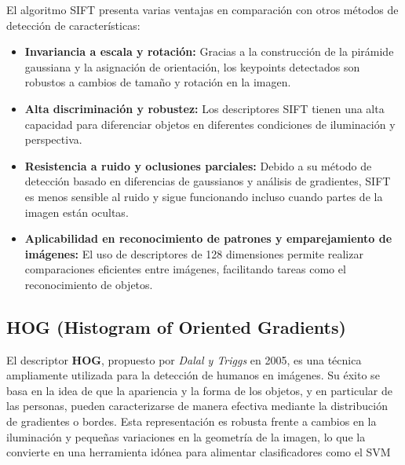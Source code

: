 \documentclass[a4paper]{article}
\begin{document}
  El algoritmo SIFT presenta varias ventajas en comparación con otros métodos de detección de características:
  
  \begin{itemize}
      \item \textbf{Invariancia a escala y rotación:}  
      Gracias a la construcción de la pirámide gaussiana y la asignación de orientación, los keypoints detectados son robustos a cambios de tamaño y rotación en la imagen.
      
      \item \textbf{Alta discriminación y robustez:}  
      Los descriptores SIFT tienen una alta capacidad para diferenciar objetos en diferentes condiciones de iluminación y perspectiva.
      
      \item \textbf{Resistencia a ruido y oclusiones parciales:}  
      Debido a su método de detección basado en diferencias de gaussianos y análisis de gradientes, SIFT es menos sensible al ruido y sigue funcionando incluso cuando partes de la imagen están ocultas.
      
      \item \textbf{Aplicabilidad en reconocimiento de patrones y emparejamiento de imágenes:}  
      El uso de descriptores de 128 dimensiones permite realizar comparaciones eficientes entre imágenes, facilitando tareas como el reconocimiento de objetos.
  \end{itemize}
  
  \par\vspace{0.5cm}
 


  \subsection{HOG (Histogram of Oriented Gradients)}
  \par\vspace{0.5cm}

  El descriptor \textbf{HOG}, propuesto por \textit{Dalal y Triggs} en 2005, es una técnica ampliamente utilizada para la detección de humanos en imágenes. Su éxito se basa en la idea de que la apariencia y la forma de los objetos, y en particular de las personas, pueden caracterizarse de manera efectiva mediante la distribución de gradientes o bordes. Esta representación es robusta frente a cambios en la iluminación y pequeñas variaciones en la geometría de la imagen, lo que la convierte en una herramienta idónea para alimentar clasificadores como el SVM
\end{document}
